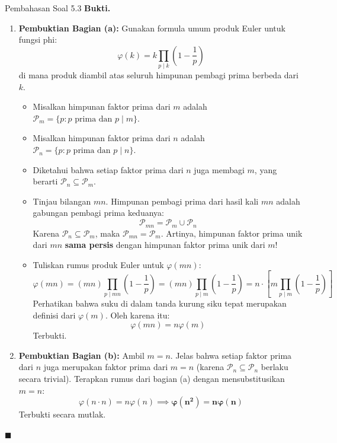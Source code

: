 \documentclass[11pt,a4paper]{article}
\newenvironment{proof}{\noindent\textbf{Bukti.}}{\hfill$\blacksquare$\vspace{0.3em}}
\begin{document}
\begin{solusibox}{Pembahasan Soal 5.3}
\begin{proof}
\begin{enumerate}[leftmargin=*]
    \item \textbf{Pembuktian Bagian (a):}
    Gunakan formula umum produk Euler untuk fungsi phi:
    \[
    \varphi(k) = k \prod_{p \mid k} \left(1 - \frac{1}{p}\right)
    \]
    di mana produk diambil atas seluruh himpunan pembagi prima berbeda dari $k$.
    \begin{itemize}
        \item Misalkan himpunan faktor prima dari $m$ adalah $\mathcal{P}_m = \{p : p \text{ prima dan } p \mid m\}$.
        \item Misalkan himpunan faktor prima dari $n$ adalah $\mathcal{P}_n = \{p : p \text{ prima dan } p \mid n\}$.
        \item Diketahui bahwa setiap faktor prima dari $n$ juga membagi $m$, yang berarti $\mathcal{P}_n \subseteq \mathcal{P}_m$.
        \item Tinjau bilangan $mn$. Himpunan pembagi prima dari hasil kali $mn$ adalah gabungan pembagi prima keduanya:
        \[
        \mathcal{P}_{mn} = \mathcal{P}_m \cup \mathcal{P}_n
        \]
        Karena $\mathcal{P}_n \subseteq \mathcal{P}_m$, maka $\mathcal{P}_{mn} = \mathcal{P}_m$. Artinya, himpunan faktor prima unik dari $mn$ \textbf{sama persis} dengan himpunan faktor prima unik dari $m$!
        \item Tuliskan rumus produk Euler untuk $\varphi(mn)$:
        \[
        \varphi(mn) = (mn) \prod_{p \mid mn} \left(1 - \frac{1}{p}\right) = (mn) \prod_{p \mid m} \left(1 - \frac{1}{p}\right) = n \cdot \left[ m \prod_{p \mid m} \left(1 - \frac{1}{p}\right) \right]
        \]
        Perhatikan bahwa suku di dalam tanda kurung siku tepat merupakan definisi dari $\varphi(m)$.
        Oleh karena itu:
        \[
        \varphi(mn) = n \varphi(m)
        \]
        Terbukti.
    \end{itemize}
    \item \textbf{Pembuktian Bagian (b):}
    Ambil $m = n$.
    Jelas bahwa setiap faktor prima dari $n$ juga merupakan faktor prima dari $m = n$ (karena $\mathcal{P}_n \subseteq \mathcal{P}_n$ berlaku secara trivial).
    Terapkan rumus dari bagian (a) dengan mensubstitusikan $m = n$:
    \[
    \varphi(n \cdot n) = n \varphi(n) \implies \mathbf{\varphi(n^2) = n \varphi(n)}
    \]
    Terbukti secara mutlak.
\end{enumerate}
\end{proof}
\end{solusibox}
\end{document}
